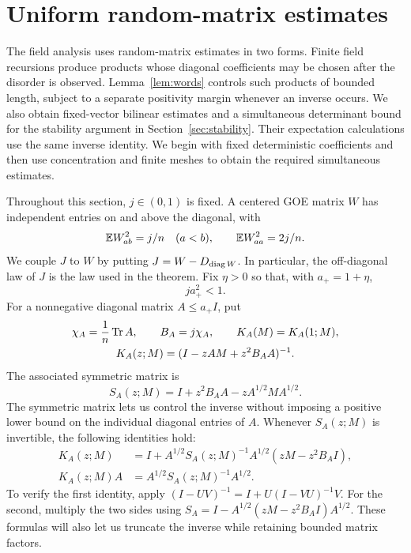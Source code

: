 \section{Uniform random-matrix estimates}\label{sec:matrices}

The field analysis uses random-matrix estimates in two forms.  Finite
field recursions produce products whose diagonal coefficients may be
chosen after the disorder is observed.  Lemma~\ref{lem:words} controls
such products of bounded length, subject to a separate positivity
margin whenever an inverse occurs.  We also obtain fixed-vector
bilinear estimates and a simultaneous determinant bound for the
stability argument in Section~\ref{sec:stability}.  Their expectation
calculations use the same inverse identity.  We begin with fixed
deterministic coefficients and then use concentration and finite meshes
to obtain the required simultaneous estimates.

Throughout this section, $j\in(0,1)$ is fixed.  A centered GOE matrix
$W$ has independent entries on and above the diagonal, with
\[
 \mathbb E W_{ab}^{2}=j/n\quad(a<b),\qquad
 \mathbb E W_{aa}^{2}=2j/n.
\]
We couple $J$ to $W$ by putting $J=W-D_{\operatorname{diag} W}$.  In particular,
the off-diagonal law of $J$ is the law used in the theorem.  Fix
$\eta>0$ so that, with $a_+=1+\eta$,
\begin{equation}\label{eq:matrix-subcritical}
 j a_+^2<1.
\end{equation}
For a nonnegative diagonal matrix $A\le a_+I$, put
\begin{equation}\label{eq:K}
 \begin{gathered}
 \chi_A=\frac1n\operatorname{Tr} A,\qquad B_A=j\chi_A,\qquad
 K_A(M)=K_A(1;M),\\
 K_A(z;M)=(I-zAM+z^2B_AA)^{-1}.
 \end{gathered}
\end{equation}
The associated symmetric matrix is
\[
 S_A(z;M)=I+z^2B_AA-zA^{1/2}MA^{1/2}.
\]
The symmetric matrix lets us control the inverse without imposing a
positive lower bound on the individual diagonal entries of $A$.
Whenever $S_A(z;M)$ is invertible, the following identities hold:
\begin{align}
 K_A(z;M)
 &=I+A^{1/2}S_A(z;M)^{-1}A^{1/2}(zM-z^2B_AI),
 \label{eq:K-symmetric-representation}\\
 K_A(z;M)A&=A^{1/2}S_A(z;M)^{-1}A^{1/2}.
 \label{eq:KA-symmetric-representation}
\end{align}
To verify the first identity, apply
$(I-UV)^{-1}=I+U(I-VU)^{-1}V$.  For the second, multiply the two
sides using $S_A=I-A^{1/2}(zM-z^2B_AI)A^{1/2}$.  These formulas
will also let us truncate the inverse while retaining bounded
matrix factors.

